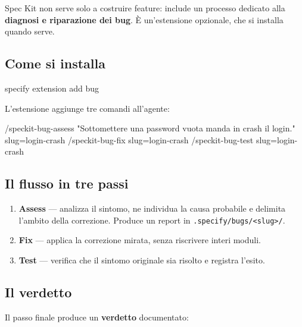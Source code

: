 \documentclass[
  italian,
  10pt,
]{book}
\newenvironment{Shaded}{\begin{snugshade}}{\end{snugshade}}
\newcommand{\ExtensionTok}[1]{#1}
\newcommand{\NormalTok}[1]{#1}
\providecommand{\tightlist}{%
  \setlength{\itemsep}{0pt}\setlength{\parskip}{0pt}}
\begin{document}
Spec Kit non serve solo a costruire feature: include un processo
dedicato alla \textbf{diagnosi e riparazione dei bug}. È un'estensione
opzionale, che si installa quando serve.

\subsection{Come si installa}\label{come-si-installa}

\begin{Shaded}
\begin{Highlighting}[]
\ExtensionTok{specify}\NormalTok{ extension add bug}
\end{Highlighting}
\end{Shaded}

L'estensione aggiunge tre comandi all'agente:

\begin{Shaded}
\begin{Highlighting}[]
\NormalTok{/speckit{-}bug{-}assess "Sottomettere una password vuota manda in crash il login." slug=login{-}crash}
\NormalTok{/speckit{-}bug{-}fix slug=login{-}crash}
\NormalTok{/speckit{-}bug{-}test slug=login{-}crash}
\end{Highlighting}
\end{Shaded}

\subsection{Il flusso in tre passi}\label{il-flusso-in-tre-passi}

\begin{enumerate}
\def\labelenumi{\arabic{enumi}.}
\tightlist
\item
  \textbf{Assess} --- analizza il sintomo, ne individua la causa
  probabile e delimita l'ambito della correzione. Produce un report in
  \texttt{.specify/bugs/\textless{}slug\textgreater{}/}.
\item
  \textbf{Fix} --- applica la correzione mirata, senza riscrivere interi
  moduli.
\item
  \textbf{Test} --- verifica che il sintomo originale sia risolto e
  registra l'esito.
\end{enumerate}

\subsection{Il verdetto}\label{il-verdetto}

Il passo finale produce un \textbf{verdetto} documentato:
\end{document}
